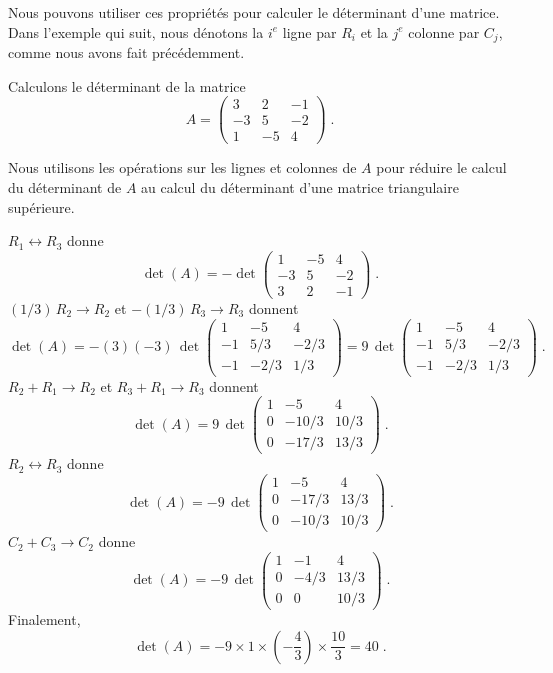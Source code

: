 {Nous pouvons utiliser ces propriétés pour calculer le déterminant d'une
matrice. Dans l'exemple qui suit, nous dénotons la $i^e$ ligne par $R_i$
et la $j^e$ colonne par $C_j$, comme nous avons fait précédemment.

\begin{egg}
Calculons le déterminant de la matrice
\[
A= \begin{pmatrix} 3 & 2 & -1 \\ -3 & 5 & -2 \\
1 & -5 & 4 \end{pmatrix} \; .
\]

Nous utilisons les opérations sur les lignes et colonnes de $A$ pour
réduire le calcul du déterminant de $A$ au calcul du déterminant d'une
matrice triangulaire supérieure.

$R_1 \leftrightarrow R_3$ donne
\[
\det(A) = -\det \begin{pmatrix} 1 & -5 & 4 \\ -3 & 5 & -2 \\
3 & 2 & -1 \end{pmatrix} \; .
\]
$(1/3) \, R_2 \rightarrow R_2$ et $-(1/3) \, R_3 \rightarrow R_3$
donnent
\[
\det(A) = -\left(3\right)\left(-3\right) \,\det
\begin{pmatrix} 1 & -5 & 4 \\ -1 & 5/3 & -2/3 \\
-1 & -2/3 & 1/3 \end{pmatrix}
= 9 \, \det
\begin{pmatrix} 1 & -5 & 4 \\ -1 & 5/3 & -2/3 \\
-1 & -2/3 & 1/3 \end{pmatrix} \; .
\]
$R_2+R_1 \rightarrow R_2$ et $R_3+R_1 \rightarrow R_3$ donnent
\[
\det(A) = 9 \,\det
\begin{pmatrix} 1 & -5 & 4 \\ 0 & -10/3 & 10/3 \\
0 & -17/3 & 13/3 \end{pmatrix} \; .
\]
$R_2 \leftrightarrow R_3$ donne
\[
\det(A) = - 9 \,\det
\begin{pmatrix} 1 & -5 & 4 \\ 0 & -17/3 & 13/3 \\
0 & -10/3 & 10/3 \end{pmatrix} \; .
\]
$C_2 + C_3 \rightarrow C_2$ donne
\[
\det(A) = - 9 \,\det
\begin{pmatrix} 1 & -1 & 4 \\ 0 & -4/3 & 13/3 \\
0 & 0 & 10/3 \end{pmatrix} \; .
\]
Finalement,
\[
\det(A) = - 9 \times 1 \times \left(-\frac{4}{3}\right)
\times \frac{10}{3} 
= 40 \; .
\]
\end{egg}

}
